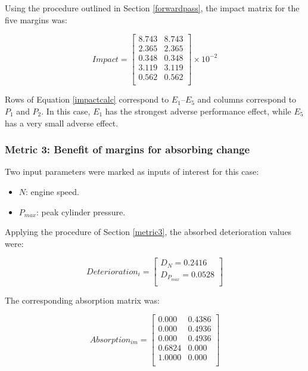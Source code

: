 Using the procedure outlined in Section \ref{forwardpass}, the impact matrix for the five margins was:

\begin{equation}\label{impactcalc} Impact= \begin{bmatrix}
8.743 & 8.743 \\
2.365 & 2.365 \\
0.348 & 0.348 \\
3.119 & 3.119 \\
0.562 & 0.562 \\
\end{bmatrix} \times 10^{-2} \end{equation}

Rows of Equation \ref{impactcalc} correspond to $E_1$--$E_5$ and columns correspond to $P_1$ and $P_2$. In this case, $E_1$ has the strongest adverse performance effect, while $E_5$ has a very small adverse effect.
 
\subsubsection{Metric 3: Benefit of margins for absorbing change}        

Two input parameters were marked as inputs of interest for this case:
\begin{itemize}
\item $N$: engine speed.
\item $P_{max}$: peak cylinder pressure.
\end{itemize}

Applying the procedure of Section \ref{metric3}, the absorbed deterioration values were:

\begin{equation} \label{eq:deterioration} 
Deterioration_i = \begin{bmatrix}
D_{N} = 0.2416\\
D_{P_{max}} = 0.0528\\
\end{bmatrix} \end{equation}

The corresponding absorption matrix was:

\begin{equation} \label{eq:absorptionout} Absorption_{im} = \begin{bmatrix}
0.000 & 0.4386 \\
0.000 & 0.4936 \\
0.000 & 0.4936 \\
0.6824 & 0.000 \\
1.0000 & 0.000 \\
\end{bmatrix} \end{equation}

